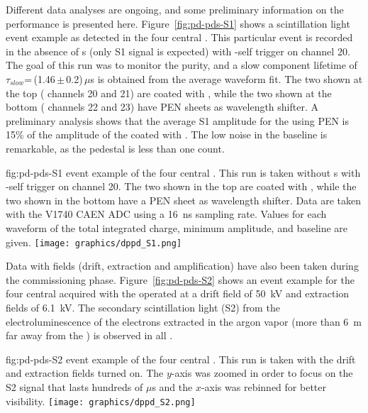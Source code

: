 Different data analyses are ongoing, and some preliminary information on the   performance is presented here. Figure~\ref{fig:pd-pds-S1} shows a scintillation light event example as detected in the four central . This particular event is recorded in the absence of \efield{}s (only S1 signal is expected) with -self trigger on  channel 20. The goal of this run was to monitor the  purity, and a slow component lifetime of $\tau_{slow}$=\,(1.46\,$\pm$\,0.2)\,$\mu$s is obtained from the average waveform fit. The two  shown at the top ( channels 20 and 21) are coated with , while the two shown at the bottom ( channels 22 and 23) have PEN sheets as wavelength shifter. A preliminary analysis shows that the average S1 amplitude for the  using PEN is 15\% of the amplitude of the  coated with . The low noise in the baseline is remarkable, as the pedestal  is less than one  count. 

\begin{dunefigure}{fig:pd-pds-S1} { event example of the four central . This run is taken without \efield{}s with -self trigger on  channel 20. The two  shown in the top are coated with , while the two shown in the bottom have a PEN sheet as wavelength shifter. Data are taken with the V1740 CAEN ADC using a \SI{16}{ns} sampling rate. Values for each waveform of the total integrated charge, minimum amplitude, and baseline are given.}
\texttt{[image: graphics/dppd\_S1.png]}
\end{dunefigure}

Data with fields (drift, extraction and amplification) have also been taken during the commissioning phase. Figure~\ref{fig:pd-pds-S2} shows an event example for the four central  acquired with the  operated at a drift field of \SI{50}{kV} and extraction fields of \SI{6.1}{kV}. The secondary scintillation light (S2) from the electroluminescence of the electrons extracted in the argon vapor (more than \SI{6}{m} far away from the ) is observed in all .

\begin{dunefigure}{fig:pd-pds-S2} { event example of the four central . %
This run is taken with the drift and extraction fields turned on. %
The $y$-axis was zoomed in order to focus on the S2 signal that lasts hundreds of $\mu$s and the $x$-axis was rebinned for better visibility.}
\texttt{[image: graphics/dppd\_S2.png]}
\end{dunefigure}

